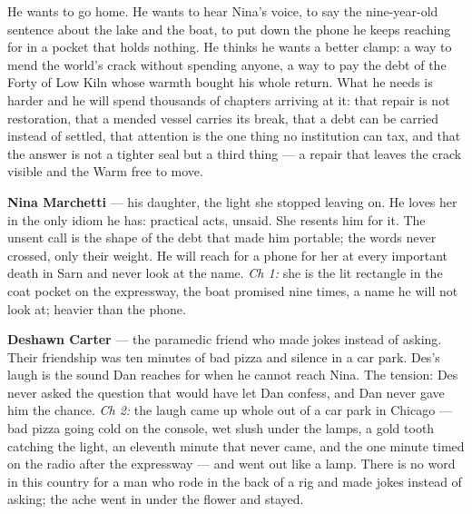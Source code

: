 \documentclass{design/chronicle}
\begin{document}
{
He wants to go home. He wants to hear Nina’s voice, to say the nine-year-old sentence about the lake and the boat, to put down the phone he keeps reaching for in a pocket that holds nothing. He thinks he wants a better clamp: a way to mend the world’s crack without spending anyone, a way to pay the debt of the Forty of Low Kiln whose warmth bought his whole return. What he needs is harder and he will spend thousands of chapters arriving at it: that repair is not restoration, that a mended vessel carries its break, that a debt can be carried instead of settled, that attention is the one thing no institution can tax, and that the answer is not a tighter seal but a third thing — a repair that leaves the crack visible and the Warm free to move.

\textbf{Nina Marchetti} — his daughter, the light she stopped leaving on. He loves her in the only idiom he has: practical acts, unsaid. She resents him for it. The unsent call is the shape of the debt that made him portable; the words never crossed, only their weight. He will reach for a phone for her at every important death in Sarn and never look at the name. \emph{Ch 1:} she is the lit rectangle in the coat pocket on the expressway, the boat promised nine times, a name he will not look at; heavier than the phone.

\textbf{Deshawn Carter} — the paramedic friend who made jokes instead of asking. Their friendship was ten minutes of bad pizza and silence in a car park. Des’s laugh is the sound Dan reaches for when he cannot reach Nina. The tension: Des never asked the question that would have let Dan confess, and Dan never gave him the chance. \emph{Ch 2:} the laugh came up whole out of a car park in Chicago --- bad pizza going cold on the console, wet slush under the lamps, a gold tooth catching the light, an eleventh minute that never came, and the one minute timed on the radio after the expressway --- and went out like a lamp. There is no word in this country for a man who rode in the back of a rig and made jokes instead of asking; the ache went in under the flower and stayed.

}
\end{document}

